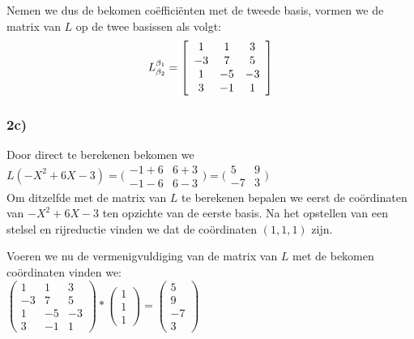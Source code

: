 \documentclass[lineaire_algebra_oplossingen.tex]{subfiles}
\begin{document}
Nemen we dus de bekomen co\"effici\"enten met de tweede basis, vormen we de matrix van $L$ op de twee basissen als volgt:\\

\[
L^{\beta_1}_{\beta_2} =
\left[
\begin{array}{c c c}
1 & 1 & 3\\
-3 & 7 & 5\\
1 & -5 & -3\\
3 & -1 & 1
\end{array}
\right]
\]

\subsubsection*{2c)}
Door direct te berekenen bekomen we\\

$ L(-X^2+6X-3) = \bigl(
\begin{smallmatrix}
-1+6&6+3\\ -1-6&6-3
\end{smallmatrix}\bigr) = \bigl(
\begin{smallmatrix}
5&9\\ -7&3
\end{smallmatrix}\bigr)$\\

Om ditzelfde met de matrix van $L$ te berekenen bepalen we eerst de co\"ordinaten van $-X^2+6X-3$ ten opzichte van de eerste basis.
Na het opstellen van een stelsel en rijreductie vinden we dat de co\"ordinaten $(1,1,1)$ zijn.

Voeren we nu de vermenigvuldiging van de matrix van $L$ met de bekomen co\"ordinaten vinden we:\\

$\begin{pmatrix}
1 & 1 & 3\\
-3 & 7 & 5\\
1 & -5 & -3\\
3 & -1 & 1
\end{pmatrix} * \begin{pmatrix}
1\\
1\\
1
\end{pmatrix} = \begin{pmatrix}
5\\
9\\
-7\\
3
\end{pmatrix}$\\
\end{document}
